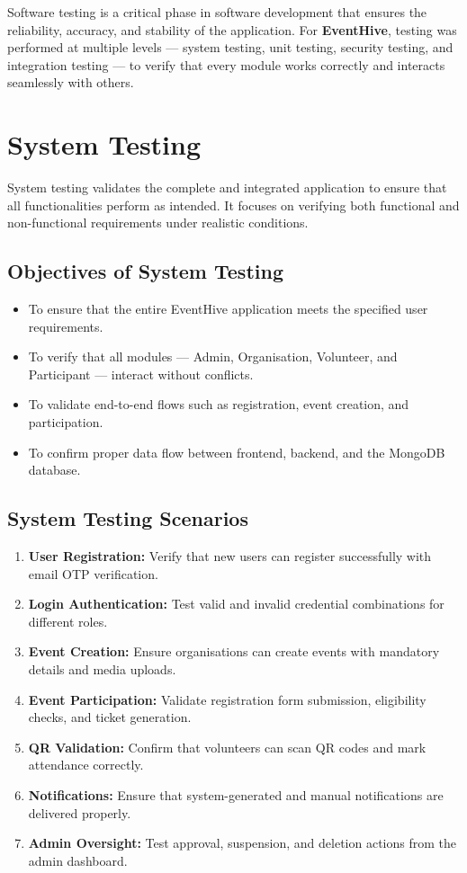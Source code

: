 \documentclass[12pt,a4paper]{report}
\begin{document}
Software testing is a critical phase in software development that ensures the reliability, accuracy, and stability of the application. For \textbf{EventHive}, testing was performed at multiple levels — system testing, unit testing, security testing, and integration testing — to verify that every module works correctly and interacts seamlessly with others.

\section{System Testing}

System testing validates the complete and integrated application to ensure that all functionalities perform as intended. It focuses on verifying both functional and non-functional requirements under realistic conditions.

\subsection*{Objectives of System Testing}
\begin{itemize}
    \item To ensure that the entire EventHive application meets the specified user requirements.
    \item To verify that all modules — Admin, Organisation, Volunteer, and Participant — interact without conflicts.
    \item To validate end-to-end flows such as registration, event creation, and participation.
    \item To confirm proper data flow between frontend, backend, and the MongoDB database.
\end{itemize}

\subsection*{System Testing Scenarios}
\begin{enumerate}
    \item \textbf{User Registration:} Verify that new users can register successfully with email OTP verification.
    \item \textbf{Login Authentication:} Test valid and invalid credential combinations for different roles.
    \item \textbf{Event Creation:} Ensure organisations can create events with mandatory details and media uploads.
    \item \textbf{Event Participation:} Validate registration form submission, eligibility checks, and ticket generation.
    \item \textbf{QR Validation:} Confirm that volunteers can scan QR codes and mark attendance correctly.
    \item \textbf{Notifications:} Ensure that system-generated and manual notifications are delivered properly.
    \item \textbf{Admin Oversight:} Test approval, suspension, and deletion actions from the admin dashboard.
\end{enumerate}
\end{document}
